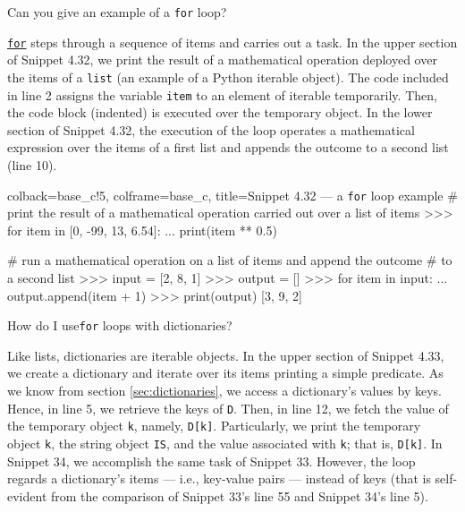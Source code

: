 \documentclass[a4paper,11pt]{book}
\newcommand{\question}[1]{%
    \begin{tcolorbox}[colback=comp_c!10,colframe=comp_c,sidebyside align=top,width=\linewidth,before skip=1ex]
        #1
    \end{tcolorbox}
    \switchcolumn%
}
\newcommand{\note}[1]{%
    \begin{tcolorbox}[colback=white!0,colframe=white!10,width=\linewidth,before skip=1ex]
        #1
    \end{tcolorbox}
}
\begin{document}
\begin{paracol}{2}
	\question{\raggedright Can you give an example of a \texttt{for} loop?}
	\note{\href{https://docs.python.org/3/reference/compound_stmts.html\#for}{\texttt{for}} steps through a sequence of items and carries out a task. In the upper section of Snippet 4.32, we print the result of a mathematical operation deployed over the items of a \texttt{list} (an example of a Python iterable object). The code included in line 2 assigns the variable \texttt{item} to an element of iterable temporarily. Then, the code block (indented) is executed over the temporary object. In the lower section of Snippet 4.32, the execution of the loop operates a mathematical expression over the items of a first list and appends the outcome to a second list (line 10).}
\end{paracol}

\begin{pythoncode}[linenos=true,]{colback=base_c!5, colframe=base_c, title=\sffamily Snippet 4.32 --- a \texttt{for} loop example}
# print the result of a mathematical operation carried out over a list of items
>>> for item in [0, -99, 13, 6.54]:
...     print(item ** 0.5)  

# run a mathematical operation on a list of items and append the outcome 
# to a second list 
>>> input = [2, 8, 1]
>>> output = []
>>> for item in input:
...    output.append(item + 1)
>>> print(output)
[3, 9, 2]
\end{pythoncode}
\clearpage
	
\begin{paracol}{2}
	\question{\raggedright How do I use\texttt{for} loops with dictionaries?}
	\note{Like lists, dictionaries are iterable objects. In the upper section of Snippet 4.33, we create a dictionary and iterate over its items printing a simple predicate. As we know from section \ref{sec:dictionaries}, we access a dictionary's values by keys. Hence, in line 5, we retrieve the keys of \texttt{D}. Then, in line 12, we fetch the value of the temporary object \texttt{k}, namely, \texttt{D[k]}. Particularly, we print the temporary object \texttt{k}, the string object \texttt{IS}, and the value associated with \texttt{k}; that is, \texttt{D[k]}. In Snippet 34, we accomplish the same task of Snippet 33. However, the loop regards a dictionary's items --- i.e., key-value pairs --- instead of keys (that is self-evident from the comparison of Snippet 33's line 55 and Snippet 34's line 5). }
\end{paracol}
\end{document}
